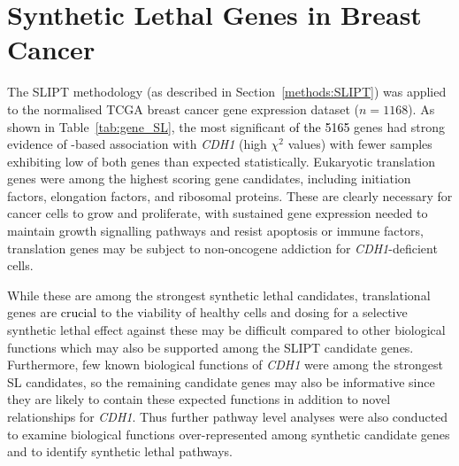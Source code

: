 \section{Synthetic Lethal Genes in Breast Cancer} \label{chapt3:exprSL_genes}

The \gls{SLIPT} methodology (as described in Section~\ref{methods:SLIPT}) was applied to the normalised \gls{TCGA} breast cancer \gls{gene expression} dataset ($n = 1168$). As shown in Table~\ref{tab:gene_SL}, the most significant \textcolor{black}{of the 5165} genes had strong evidence of -based association with \textit{CDH1} (high $\chi^2$ values) with fewer samples exhibiting low  of both genes than expected statistically. Eukaryotic translation genes were among the highest scoring gene candidates, including initiation factors, elongation factors, and ribosomal proteins. These are clearly necessary for cancer cells to grow and proliferate, with sustained \gls{gene expression} needed to maintain growth signalling \glspl{pathway} and resist apoptosis or immune factors, translation genes may be subject to \gls{non-oncogene addiction} for \textit{CDH1}-deficient cells.

While these are among the strongest \gls{synthetic lethal} candidates, translational genes are \textcolor{black}{crucial} to the viability of healthy cells and dosing for a selective \gls{synthetic lethal} effect against these may be difficult compared to other biological functions which may also be supported among the \gls{SLIPT} candidate genes. Furthermore, few known biological functions of \textit{CDH1} were among the strongest SL candidates, so the remaining candidate genes may also be informative since they are likely to contain these expected functions in addition to novel relationships for \textit{CDH1}. Thus further \gls{pathway} level analyses were also conducted to examine biological functions over-represent\-ed among synthetic candidate genes and to identify \gls{synthetic lethal} \glspl{pathway}.

